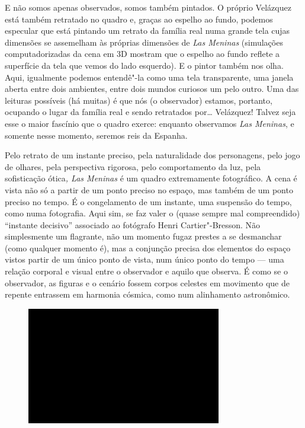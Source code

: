 E não somos apenas observados, somos também pintados. O próprio
Velázquez está também retratado no quadro e, graças ao espelho ao fundo,
podemos especular que está pintando um retrato da família real numa
grande tela cujas dimensões se assemelham às próprias dimensões de
\emph{Las Meninas} (simulações computadorizadas da cena em 3D mostram
que o espelho ao fundo reflete a superfície da tela que vemos do lado
esquerdo). E o pintor também nos olha. Aqui, igualmente podemos entendê"-la
como uma tela transparente, uma janela aberta entre dois ambientes,
entre dois mundos curiosos um pelo outro. Uma das leituras possíveis (há
muitas) é que nós (o observador) estamos, portanto, ocupando o lugar da
família real e sendo retratados por\ldots{} Velázquez! Talvez seja esse o
maior fascínio que o quadro exerce: enquanto observamos \emph{Las
Meninas}, e somente nesse momento, seremos reis da Espanha.

Pelo retrato de um instante preciso, pela naturalidade dos personagens,
pelo jogo de olhares, pela perspectiva rigorosa, pelo comportamento da
luz, pela sofisticação ótica\emph{, Las Meninas} é um quadro
extremamente fotográfico. A cena é vista não só a partir de um ponto
preciso no espaço, mas também de um ponto preciso no tempo. É o
congelamento de um instante, uma suspensão do tempo, como numa
fotografia. Aqui sim, se faz valer o (quase sempre mal compreendido)
``instante decisivo'' associado ao fotógrafo Henri Cartier"-Bresson. Não
simplesmente um flagrante, não um momento fugaz prestes a se desmanchar
(como qualquer momento é), mas a conjunção precisa dos elementos do
espaço vistos partir de um único ponto de vista, num único ponto do
tempo --- uma relação corporal e visual entre o observador e aquilo que
observa. É como se o observador, as figuras e o cenário fossem corpos
celestes em movimento que de repente entrassem em harmonia cósmica, como
num alinhamento astronômico.

\begin{figure}[!ht]
\centering
 \includegraphics[width=85mm]{./imgs/im1.jpg}
\caption{\tiny{}}
\end{figure}

